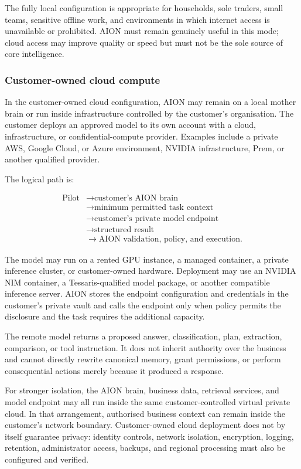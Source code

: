 The fully local configuration is appropriate for households, sole traders,
small teams, sensitive offline work, and environments in which internet access
is unavailable or prohibited.  AION must remain genuinely useful in this mode;
cloud access may improve quality or speed but must not be the sole source of
core intelligence.

\subsubsection{Customer-owned cloud compute}

In the customer-owned cloud configuration, AION may remain on a local mother
brain or run inside infrastructure controlled by the customer's organisation.
The customer deploys an approved model to its own account with a cloud,
infrastructure, or confidential-compute provider.  Examples include a private
AWS, Google Cloud, or Azure environment, NVIDIA infrastructure, Prem, or another
qualified provider.

The logical path is:

\[
\begin{split}
\text{Pilot}
&\rightarrow \text{customer's AION brain} \\
&\rightarrow \text{minimum permitted task context} \\
&\rightarrow \text{customer's private model endpoint} \\
&\rightarrow \text{structured result} \\
&\rightarrow \text{AION validation, policy, and execution}.
\end{split}
\]

The model may run on a rented GPU instance, a managed container, a private
inference cluster, or customer-owned hardware.  Deployment may use an NVIDIA
NIM container, a Tessaris-qualified model package, or another compatible
inference server.  AION stores the endpoint configuration and credentials in
the customer's private vault and calls the endpoint only when policy permits
the disclosure and the task requires the additional capacity.

The remote model returns a proposed answer, classification, plan, extraction,
comparison, or tool instruction.  It does not inherit authority over the
business and cannot directly rewrite canonical memory, grant permissions, or
perform consequential actions merely because it produced a response.

For stronger isolation, the AION brain, business data, retrieval services, and
model endpoint may all run inside the same customer-controlled virtual private
cloud.  In that arrangement, authorised business context can remain inside the
customer's network boundary.  Customer-owned cloud deployment does not by
itself guarantee privacy: identity controls, network isolation, encryption,
logging, retention, administrator access, backups, and regional processing must
also be configured and verified.


